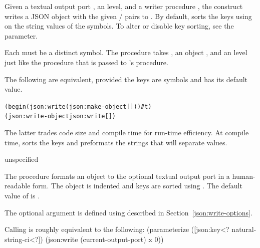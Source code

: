 \begin{syntax}
\end{syntax}
\returns{} 

Given a textual output port , an  level, and a
writer procedure , the  construct
writes a JSON object with the given  /  pairs to
. By default,  sorts the keys using
 on the string values of the symbols.
To alter or disable key sorting, see the  parameter.

Each  must be a distinct symbol.  The 
procedure takes , an object , and an  level
just like the  procedure that is passed to 's
 procedure.

The following are equivalent, provided the keys are symbols and  has its default value.

\antipar\begin{alltt}
(begin (json:write  (json:make-object [ ] \etc) ) \#t)
(json:write-object   json:write [ ] \etc)\end{alltt}\antipar

The latter trades code size and compile time for run-time efficiency.
At compile time,  sorts the keys and
preformats the strings that will separate values.

\begin{procedure}
\end{procedure}
\returns{} unspecified

The  procedure formats an object  to the
optional textual output port  in a human-readable form. The
object is indented and keys are sorted using
. The default value of  is
.

The optional  argument is defined using
 described in
Section~\ref{json:write-options}.

Calling  is roughly equivalent to the following:
\antipar\codebegin
(parameterize ([json:key<? natural-string-ci<?])
  (json:write (current-output-port) x 0))
\codeend

